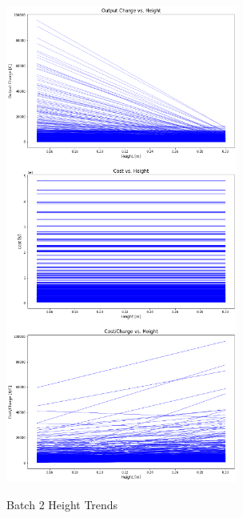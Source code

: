 \begin{figure}
    \begin{center}
    \includegraphics[width=3in]{fig28.png}
    \end{center}
    \renewcommand{\baselinestretch}{1}
    \small\normalsize
    \begin{quote}
    \caption[Batch 2 Height Trends]{Batch 2 Height Trends} \label{fig: f28}
    \end{quote}
\end{figure}

